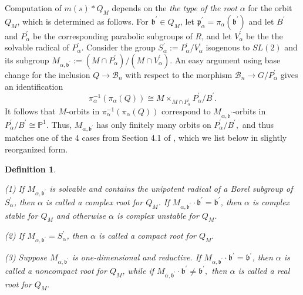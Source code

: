 \documentclass[12pt]{amsart}
\numberwithin{equation}{section}
\newtheorem{dfn}[thm]{Definition}
\newcommand{\fk}{\mbox{${\mathfrak k}$}}
\newcommand{\fp}{\mbox{${\mathfrak p}$}}
\newcommand{\fb}{\mbox{${\mathfrak b}$}}
\newcommand{\PR}{\mbox{${\mathbb P}$}}
\newcommand{\B}{\mathcal{B}}
\begin{document}
Computation of $m(s)*Q_{M}$ depends on the \emph{the type of the root} $\alpha$ for the orbit $Q_{M}$, which is determined as follows.  For $\fb^{\prime}\in Q_M$, let $\fp_{\alpha}^{\prime} = \pi_{\alpha}(\fb^{\prime})$ and let $B^{\prime}$ and $P_{\alpha}^{\prime}$ be the corresponding parabolic subgroups of $R$, and let $V_{\alpha}^{\prime}$ be the the solvable radical of $P_{\alpha}^{\prime}$.  
Consider the group 
$S_{\alpha}^{\prime}:= P_{\alpha}^{\prime}/V_{\alpha}^{\prime}$ isogenous to $SL(2)$ and its subgroup 
$M_{\alpha, \fb^{\prime}}:= (M \cap P_{\alpha}^{\prime})/(M\cap V_{\alpha}^{\prime})$.   
An easy argument using base change for the inclusion $Q \to \B_n$ with respect to the morphism $\B_n \to G/P_{\alpha}^{\prime}$ gives an identification 
\begin{equation}\label{e:monoidid}
\pi_{\alpha}^{-1}(\pi_{\alpha}(Q)) \cong M\times_{M\cap P_{\alpha}^{\prime}} P_{\alpha}^{\prime}/B^{\prime}.
\end{equation}
It follows that $M$-orbits in
 $\pi_{\alpha}^{-1}(\pi_{\alpha}(Q))$ correspond to $M_{\alpha, \fb^{\prime}}$-orbits in 
$P^{\prime}_{\alpha}/B^{\prime}\cong {\PR}^1.$  Thus, $M_{\alpha, \fb^{\prime}}$ has only finitely many orbits on $P_{\alpha}^{\prime}/B^{\prime},$ and thus matches one of the 4 cases from Section 4.1 of \cite{RS}, which we list below in slightly reorganized form.

\begin{dfn}\label{d:roottype}
\par\noindent (1) If $M_{\alpha, \fb^{\prime}}$ is solvable and contains the unipotent radical of a Borel subgroup of $S_{\alpha}^{\prime}$, then $\alpha$ is called a complex root for $Q_M$.  If $M_{\alpha, \fb^{\prime}}\cdot \fb^{\prime}=\fb^{\prime}$, then $\alpha$ is complex stable for $Q_M$ and otherwise $\alpha$ is complex unstable for $Q_M$.
\par\noindent (2) If $M_{\alpha, \fb^{\prime}}=S_{\alpha}^{\prime}$, then $\alpha$ is called a compact   root for $Q_M.$
\par\noindent (3) Suppose $M_{\alpha, \fb^{\prime}}$ is one-dimensional and reductive.
If $M_{\alpha,\fb^{\prime}}\cdot \fb^{\prime}=\fb^{\prime}$, then $\alpha$ is called a noncompact   root for $Q_M$, while if $M_{\alpha,\fb^{\prime}}\cdot \fb^{\prime}\not=\fb^{\prime},$ then $\alpha$ is called a real root for $Q_M.$
\end{dfn}
\end{document}
